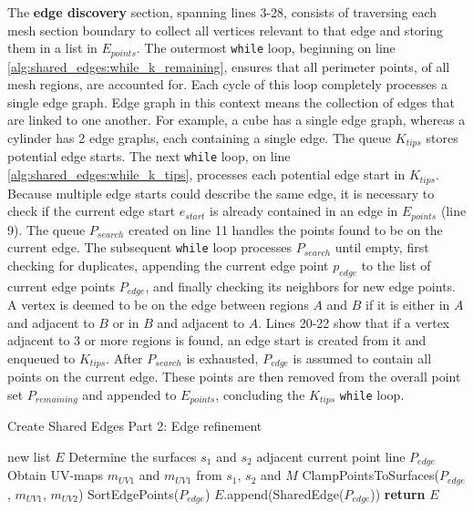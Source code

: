 The \textbf{edge discovery} section, spanning lines 3-28, consists of traversing each mesh section boundary to collect all vertices relevant to that edge and storing them in a list in $E_{points}$.
The outermost \verb|while| loop, beginning on line \ref{alg:shared_edges:while_k_remaining}, ensures that all perimeter points, of all mesh regions, are accounted for.
Each cycle of this loop completely processes a single edge graph.
Edge graph in this context means the collection of edges that are linked to one another.
For example, a cube has a single edge graph, whereas a cylinder has 2 edge graphs, each containing a single edge.
The queue $K_{tips}$ stores potential edge starts.
The next \verb|while| loop, on line \ref{alg:shared_edges:while_k_tips}, processes each potential edge start in $K_{tips}$.
Because multiple edge starts could describe the same edge, it is necessary to check if the current edge start $e_{start}$ is already contained in an edge in $E_{points}$ (line 9).
The queue $P_{search}$ created on line 11 handles the points found to be on the current edge.
The subsequent \verb|while| loop processes $P_{search}$ until empty, first checking for duplicates, appending the current edge point $p_{edge}$ to the list of current edge points $P_{edge}$, and finally checking its neighbors for new edge points.
A vertex is deemed to be on the edge between regions $A$ and $B$ if it is either in $A$ and adjacent to $B$ or in $B$ and adjacent to $A$.
Lines 20-22 show that if a vertex adjacent to 3 or more regions is found, an edge start is created from it and enqueued to $K_{tips}$.
After $P_{search}$ is exhausted, $P_{edge}$ is assumed to contain all points on the current edge.
These points are then removed from the overall point set $P_{remaining}$ and appended to $E_{points}$, concluding the $K_{tips}$ \verb|while| loop.

\begin{algorithm}[htb]
	\caption{Create Shared Edges Part 2: Edge refinement}\label{alg:shared_edges_2}
\begin{algorithmic}[1]
	\State new list $E$ 
	\label{alg:edge_refinement_for}
		\State Determine the surfaces $s_1$ and $s_2$ adjacent current point line $P_{edge}$
		\State Obtain UV-maps $m_{UV1}$ and $m_{UV1}$ from $s_1$, $s_2$ and $M$
		\State ClampPointsToSurfaces($P_{edge}$, $m_{UV1}$, $m_{UV2}$)\label{alg:edge_refinement_clamp_pts}
		\State SortEdgePoints($P_{edge}$)
		\State $E$.append(SharedEdge($P_{edge}$))
	\EndFor
	\State \textbf{return} $E$
\EndFunction
\end{algorithmic}
\end{algorithm}


